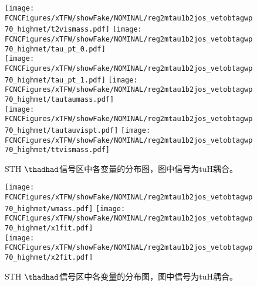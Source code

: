 \begin{figure}[H]
\centering
\texttt{[image: \\FCNCFigures/xTFW/showFake/NOMINAL/reg2mtau1b2jos\_vetobtagwp70\_highmet/t2vismass.pdf]}
\texttt{[image: \\FCNCFigures/xTFW/showFake/NOMINAL/reg2mtau1b2jos\_vetobtagwp70\_highmet/tau\_pt\_0.pdf]}
\\
\texttt{[image: \\FCNCFigures/xTFW/showFake/NOMINAL/reg2mtau1b2jos\_vetobtagwp70\_highmet/tau\_pt\_1.pdf]}
\texttt{[image: \\FCNCFigures/xTFW/showFake/NOMINAL/reg2mtau1b2jos\_vetobtagwp70\_highmet/tautaumass.pdf]}
\\
\texttt{[image: \\FCNCFigures/xTFW/showFake/NOMINAL/reg2mtau1b2jos\_vetobtagwp70\_highmet/tautauvispt.pdf]}
\texttt{[image: \\FCNCFigures/xTFW/showFake/NOMINAL/reg2mtau1b2jos\_vetobtagwp70\_highmet/ttvismass.pdf]}
\\
\caption{STH $\thadhad$信号区中各变量的分布图，图中信号为tuH耦合。}
\label{fig:var_reg2mtau1b2jos_vetobtagwp70_highmet_1}
\end{figure}
\begin{figure}[H]
\centering
\texttt{[image: \\FCNCFigures/xTFW/showFake/NOMINAL/reg2mtau1b2jos\_vetobtagwp70\_highmet/wmass.pdf]}
\texttt{[image: \\FCNCFigures/xTFW/showFake/NOMINAL/reg2mtau1b2jos\_vetobtagwp70\_highmet/x1fit.pdf]}
\\
\texttt{[image: \\FCNCFigures/xTFW/showFake/NOMINAL/reg2mtau1b2jos\_vetobtagwp70\_highmet/x2fit.pdf]}
\caption{STH $\thadhad$信号区中各变量的分布图，图中信号为tuH耦合。}
\label{fig:var_reg2mtau1b2jos_vetobtagwp70_highmet}
\end{figure}
